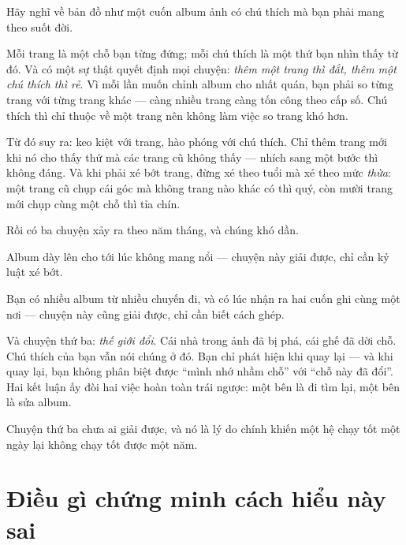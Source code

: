 \documentclass[../../vslam.tex]{subfiles}
\begin{document}
\begin{dongian}
Hãy nghĩ về bản đồ như một cuốn album ảnh có chú thích mà bạn phải mang theo suốt đời.

Mỗi trang là một chỗ bạn từng đứng; mỗi chú thích là một thứ bạn nhìn thấy từ đó. Và có một sự thật quyết định mọi chuyện: \emph{thêm một trang thì đắt, thêm một chú thích thì rẻ}. Vì mỗi lần muốn chỉnh album cho nhất quán, bạn phải so từng trang với từng trang khác --- càng nhiều trang càng tốn công theo cấp số. Chú thích thì chỉ thuộc về một trang nên không làm việc so trang khó hơn.

Từ đó suy ra: keo kiệt với trang, hào phóng với chú thích. Chỉ thêm trang mới khi nó cho thấy thứ mà các trang cũ không thấy --- nhích sang một bước thì không đáng. Và khi phải xé bớt trang, đừng xé theo tuổi mà xé theo mức \emph{thừa}: một trang cũ chụp cái góc mà không trang nào khác có thì quý, còn mười trang mới chụp cùng một chỗ thì tỉa chín.

Rồi có ba chuyện xảy ra theo năm tháng, và chúng khó dần.

Album dày lên cho tới lúc không mang nổi --- chuyện này giải được, chỉ cần kỷ luật xé bớt.

Bạn có nhiều album từ nhiều chuyến đi, và có lúc nhận ra hai cuốn ghi cùng một nơi --- chuyện này cũng giải được, chỉ cần biết cách ghép.

Và chuyện thứ ba: \emph{thế giới đổi}. Cái nhà trong ảnh đã bị phá, cái ghế đã dời chỗ. Chú thích của bạn vẫn nói chúng ở đó. Bạn chỉ phát hiện khi quay lại --- và khi quay lại, bạn không phân biệt được ``mình nhớ nhầm chỗ'' với ``chỗ này đã đổi''. Hai kết luận ấy đòi hai việc hoàn toàn trái ngược: một bên là đi tìm lại, một bên là sửa album.

Chuyện thứ ba chưa ai giải được, và nó là lý do chính khiến một hệ chạy tốt một ngày lại không chạy tốt được một năm.

\end{dongian}

\section{Điều gì chứng minh cách hiểu này sai}
\end{document}
